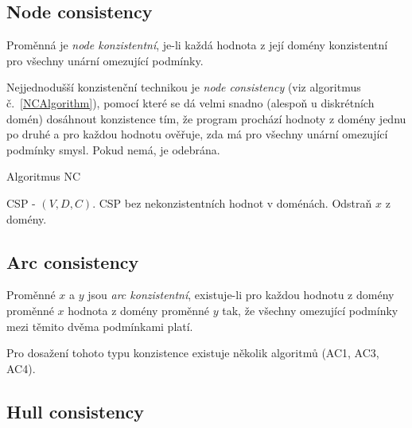 \subsection{Node consistency}

\begin{definition}
\label{def:nodeConsistency}
Proměnná je \emph{node konzistentní}, je-li každá hodnota z její domény konzistentní pro všechny unární omezující podmínky.
\end{definition}

Nejjednodušší konzistenční technikou je \emph{node consistency} \cite{bartakGuide} (viz algoritmus č.~\ref{NCAlgorithm}), pomocí které se dá velmi snadno (alespoň u diskrétních domén) dosáhnout konzistence tím, že program prochází hodnoty z domény jednu po druhé a pro každou hodnotu ověřuje, zda má pro všechny unární omezující podmínky smysl. Pokud nemá, je odebrána.


\begin{algorithm}
\caption{Algoritmus NC}
\label{NCAlgorithm}
\begin{algorithmic}[1]
\Require CSP - $(V, D, C)$.
\Ensure CSP bez nekonzistentních hodnot v doménách.
\State Odstraň $x$ z domény.
\EndIf
\EndFor
\EndFor
\EndFor
\EndProcedure
\end{algorithmic}
\end{algorithm}


\subsection{Arc consistency}

\begin{definition}
\label{def:arcConsistency}
Proměnné $x$ a $y$ jsou \emph{arc konzistentní}, existuje-li pro každou hodnotu z domény proměnné $x$ hodnota z domény proměnné $y$ tak, že všechny omezující podmínky mezi těmito dvěma podmínkami platí.
\end{definition}

Pro dosažení tohoto typu konzistence existuje několik algoritmů (AC1, AC3, AC4).






\subsection{Hull consistency}

